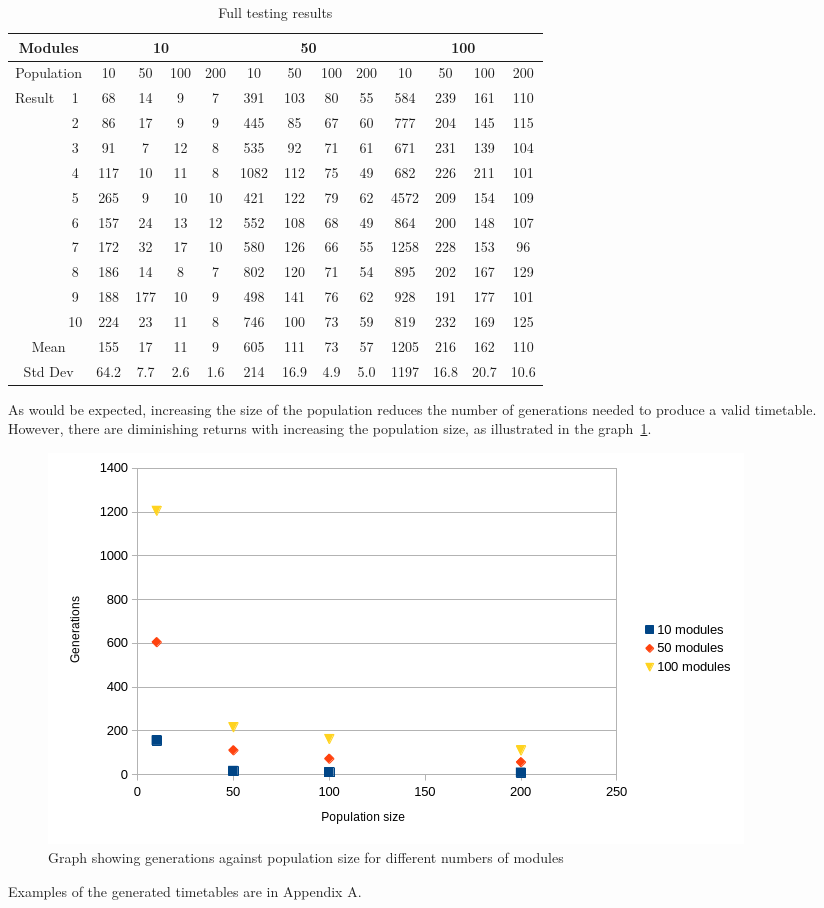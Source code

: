 \begin{table}[ht]
	\begin{tabular}{cc|cccc|cccc|cccc}
		\toprule
		\multicolumn{2}{c}{Modules}
			& \multicolumn{4}{c}{10}
			& \multicolumn{4}{c}{50}
			& \multicolumn{4}{c}{100} \\
		\midrule
		\multicolumn{2}{c}{Population}
			& 10 & 50 & 100 & 200 
			& 10 & 50 & 100 & 200 
			& 10 & 50 & 100 & 200 \\
		\midrule
		Result & 1
			& 68 & 14 & 9 & 7
			& 391 & 103 & 80 & 55
			& 584 & 239 & 161 & 110 \\
		& 2
			& 86 & 17 & 9 & 9
			& 445 & 85 & 67 & 60
			& 777 & 204 & 145 & 115 \\
		& 3
			& 91 & 7 & 12 & 8
			& 535 & 92 & 71 & 61
			& 671 & 231 & 139 & 104 \\
		& 4
			& 117 & 10 & 11 & 8
			& 1082 & 112 & 75 & 49
			& 682 & 226 & 211 & 101 \\
		& 5
			& 265 & 9 & 10 & 10
			& 421 & 122 & 79 & 62
			& 4572 & 209 & 154 & 109 \\
		& 6
			& 157 & 24 & 13 & 12
			& 552 & 108 & 68 & 49
			& 864 & 200 & 148 & 107 \\
		& 7
			& 172 & 32 & 17 & 10
			& 580 & 126 & 66 & 55
			& 1258 & 228 & 153 & 96 \\
		& 8
			& 186 & 14 & 8 & 7
			& 802 & 120 & 71 & 54
			& 895 & 202 & 167 & 129 \\
		& 9
			& 188 & 177 & 10 & 9
			& 498 & 141 & 76 & 62
			& 928 & 191 & 177 & 101 \\
		& 10
			& 224 & 23 & 11 & 8
			& 746 & 100 & 73 & 59
			& 819 & 232 & 169 & 125 \\
		\midrule
		\multicolumn{2}{c}{Mean}
			& 155 & 17 & 11 & 9
			& 605 & 111 & 73 & 57
			& 1205 & 216 & 162 & 110 \\
		\multicolumn{2}{c}{Std Dev}
			& 64.2 & 7.7 & 2.6 & 1.6
			& 214 & 16.9 & 4.9 & 5.0
			& 1197 & 16.8 & 20.7 & 10.6 \\
		\bottomrule
	\end{tabular}
	\caption{Full testing results}
	\label{table:results-full}
\end{table}

As would be expected, increasing the size of the population reduces the number
of generations needed to produce a valid timetable.
However, there are diminishing returns with increasing the population size, as
illustrated in the graph~\ref*{fig:graph-1}.

\begin{figure}[ht]
	\centering
	\includegraphics[scale=0.6]{images/graph-1.png}
	\caption{Graph showing generations against population size for different 
		numbers of modules}
	\label{fig:graph-1}
\end{figure}

Examples of the generated timetables are in Appendix A.